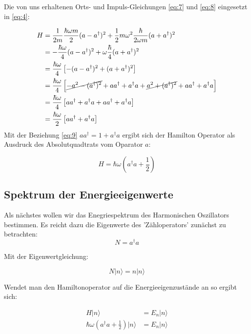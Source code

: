 Die von uns erhaltenen Orts- und Impuls-Gleichungen \eqref{eq:7} und \eqref{eq:8} eingesetzt in \eqref{eq:4}:


\begin{align}
  \label{eq:10}
   H &= \frac{1}{2m}\frac{\hbar \omega m}{2}(a-a^\dagger)^2 +  \frac{1}{2}m\omega^2\frac{\hbar}{2\omega m}(a+a^\dagger)^2 \\
&= -\frac{\hbar \omega}{4}(a-a^\dagger)^2 +  \omega\frac{\hbar}{4}(a+a^\dagger)^2 \\
&= \frac{\hbar \omega}{4}\left[-(a-a^\dagger)^2 + (a+a^\dagger)^2\right] \\
&= \frac{\hbar \omega}{4}\left[\cancel{-a^2-(a^\dagger)^2}+aa^\dagger+a^\dagger a +\cancel{a^2+(a^\dagger)^2}+aa^\dagger+a^\dagger a \right] \\
&= \frac{\hbar \omega}{4}\left[aa^\dagger+a^\dagger a +aa^\dagger+a^\dagger a \right] \\
&= \frac{\hbar \omega}{2}\left[aa^\dagger+a^\dagger a \right] \\
\end{align}
Mit der Beziehung \eqref{eq:9} \(aa^\dagger = 1 + a^\dagger a \) ergibt sich der Hamilton Operator als Ausdruck des Absolutquadtrats vom Oparator \(a\):

\begin{equation}
  \label{eq:11}
  \boxed{ H = \hbar\omega\left(a^\dagger a + \frac{1}{2}\right) }
\end{equation}

\subsection*{Spektrum der Energieeigenwerte}

Als nächstes wollen wir das Enegriespektrum des Harmonischen Oszillators bestimmen. Es reicht dazu die Eigenwerte des 'Zähloperators' zunächst zu betrachten:
\begin{equation}
  \label{eq:12}
  N = a^\dagger a
\end{equation}

Mit der Eigenwertgleichung:

\begin{equation}
  \label{eq:13}
  N|n\rangle  = n|n\rangle 
\end{equation}

Wendet man den Hamiltonoperator auf die Energieeigenzustände an so ergibt sich:

\begin{align}
  \label{eq:14}
  H|n\rangle &=E_n|n\rangle\\
 \hbar\omega\left(a^\dagger a + \frac{1}{2}\right)|n\rangle &= E_n|n\rangle 
\end{align}


